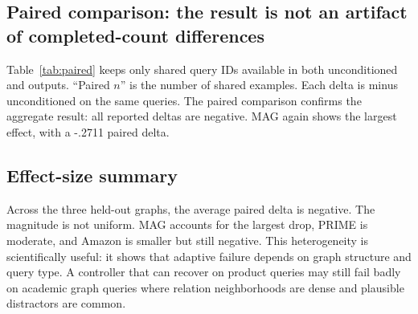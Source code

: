 \subsection{Paired comparison: the result is not an artifact of completed-count differences}
Table~\ref{tab:paired} keeps only shared query IDs available in both unconditioned and \tb outputs. ``Paired $n$'' is the number of shared examples. Each delta is \tb minus unconditioned on the same queries. The paired comparison confirms the aggregate result: all reported deltas are negative. MAG again shows the largest effect, with a -.2711 paired \mrr delta.

\begin{table}[t]
\centering
\caption{\textbf{Shared-ID paired diagnostics.} Rows compare \tb and the unconditioned agent on identical query IDs. $\Delta\hit{5}$, $\Delta\recall{20}$, and $\Delta\mrr$ are \tb-minus-unconditioned. Negative values indicate that \tb ranks correct answers lower or retrieves fewer gold answers.}
\label{tab:paired}
\end{table}

\subsection{Effect-size summary}
Across the three held-out graphs, the average paired \mrr delta is negative. The magnitude is not uniform. MAG accounts for the largest drop, PRIME is moderate, and Amazon is smaller but still negative. This heterogeneity is scientifically useful: it shows that adaptive failure depends on graph structure and query type. A controller that can recover on product queries may still fail badly on academic graph queries where relation neighborhoods are dense and plausible distractors are common.

